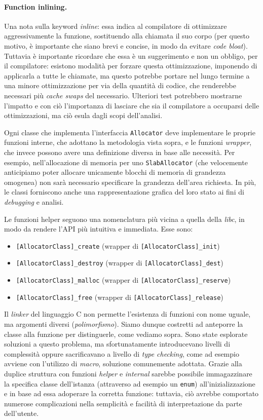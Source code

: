 \paragraph{Function inlining.}
Una nota sulla keyword \textit{inline}: essa indica al compilatore di ottimizzare aggressivamente la funzione, sostituendo alla chiamata il suo corpo (per questo motivo, è importante che siano brevi e concise, in modo da evitare \textit{code bloat}). Tuttavia è importante ricordare che essa è un suggerimento e non un obbligo, per il compilatore: esistono modalità per forzare questa ottimizzazione, imponendo di applicarla a tutte le chiamate, ma questo potrebbe portare nel lungo termine a una minore ottimizzazione per via della quantità di codice, che renderebbe necessari più \textit{cache swaps} del necessario. Ulteriori test potrebbero mostrarne l’impatto e con ciò l’importanza di lasciare che sia il compilatore a occuparsi delle ottimizzazioni, ma ciò esula dagli scopi dell’analisi.

Ogni classe che implementa l’interfaccia \texttt{Allocator} deve implementare le proprie funzioni interne, che adottano la metodologia vista sopra, e le funzioni \textit{wrapper}, che invece possono avere una definizione diversa in base alle necessità. Per esempio, nell’allocazione di memoria per uno \texttt{SlabAllocator} (che velocemente anticipiamo poter allocare unicamente blocchi di memoria di grandezza omogenea) non sarà necessario specificare la grandezza dell’area richiesta. In più, le classi forniscono anche una rappresentazione grafica del loro stato ai fini di \textit{debugging} e analisi.

Le funzioni helper seguono una nomenclatura più vicina a quella della \textit{libc}, in modo da rendere l’API più intuitiva e immediata. Esse sono:
\begin{itemize}
    \item \texttt{[AllocatorClass]\_create} (wrapper di \texttt{[AllocatorClass]\_init})
    \item \texttt{[AllocatorClass]\_destroy} (wrapper di \texttt{[AllocatorClass]\_dest})
    \item \texttt{[AllocatorClass]\_malloc} (wrapper di \texttt{[AllocatorClass]\_reserve})
    \item \texttt{[AllocatorClass]\_free} (wrapper di \texttt{[AllocatorClass]\_release})
\end{itemize}
Il \textit{linker} del linguaggio C non permette l'esistenza di funzioni con nome uguale, ma argomenti diversi (\textit{polimorfismo}). Siamo dunque costretti ad anteporre la classe alla funzione per distinguerle, come vediamo sopra. Sono state esplorate soluzioni a questo problema, ma sfortunatamente introducevano livelli di complessità oppure sacrificavano a livello di \textit{type checking}, come ad esempio avviene con l'utilizzo di \textit{macro}, soluzione comunemente adottata. Grazie alla duplice struttura con funzioni \textit{helper} e \textit{internal} sarebbe possibile immagazzinare la specifica classe dell'istanza (attraverso ad esempio un \texttt{enum}) all'inizializzazione e in base ad essa adoperare la corretta funzione: tuttavia, ciò avrebbe comportato numerose complicazioni nella semplicità e facilità di interpretazione da parte dell'utente.

